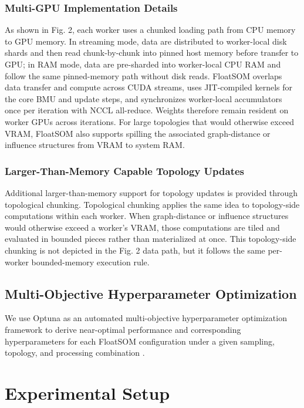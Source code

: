 \documentclass[10pt]{article} %
\begin{document}
\subsubsection{Multi-GPU Implementation Details}

As shown in Fig. 2, each worker uses a chunked loading path from CPU memory to GPU memory. In streaming mode, data are distributed to worker-local disk shards and then read chunk-by-chunk into pinned host memory before transfer to GPU; in RAM mode, data are pre-sharded into worker-local CPU RAM and follow the same pinned-memory path without disk reads. FloatSOM overlaps data transfer and compute across CUDA streams, uses JIT-compiled kernels for the core BMU and update steps, and synchronizes worker-local accumulators once per iteration with NCCL all-reduce. Weights therefore remain resident on worker GPUs across iterations. For large topologies that would otherwise exceed VRAM, FloatSOM also supports spilling the associated graph-distance or influence structures from VRAM to system RAM.

\subsubsection{Larger-Than-Memory Capable Topology Updates}

Additional larger-than-memory support for topology updates is provided through topological chunking. Topological chunking applies the same idea to topology-side computations within each worker. When graph-distance or influence structures would otherwise exceed a worker's VRAM, those computations are tiled and evaluated in bounded pieces rather than materialized at once. This topology-side chunking is not depicted in the Fig. 2 data path, but it follows the same per-worker bounded-memory execution rule.

\subsection{Multi-Objective Hyperparameter Optimization}

We use Optuna as an automated multi-objective hyperparameter optimization framework to derive near-optimal performance and corresponding hyperparameters for each FloatSOM configuration under a given sampling, topology, and processing combination \citep{akibaOptunaNextgenerationHyperparameter2019}.

\section{Experimental Setup}
\end{document}
